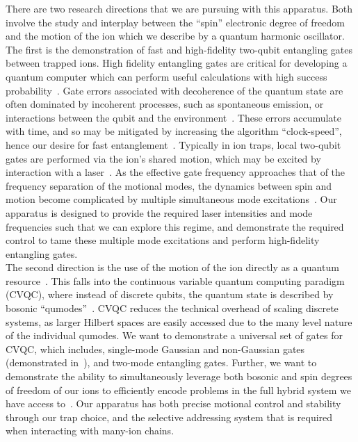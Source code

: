    There are two research directions that we are pursuing with this apparatus.
    Both involve the study and interplay between the ``spin'' electronic degree
    of freedom and the motion of the ion which we describe by a quantum harmonic
    oscillator.\\
    The first is the demonstration of fast and high-fidelity two-qubit
    entangling gates between trapped ions. High fidelity entangling gates are
    critical for developing a quantum computer which can perform useful
    calculations with high success probability~\cite{}. Gate errors associated with
    decoherence of the quantum state are often dominated by incoherent
    processes, such as spontaneous emission, or interactions between the qubit
    and the environment~\cite{wineland_experimental_1998}. These errors accumulate with time, and so may be
    mitigated by increasing the algorithm ``clock-speed'', hence our desire for
    fast entanglement~\cite{}. Typically in ion traps, local two-qubit gates are
    performed via the ion's shared motion, which may be excited by interaction
    with a laser~\cite{sorensen_entanglement_2000}. As the effective gate frequency approaches that of the
    frequency separation of the motional modes, the dynamics between spin and
    motion become complicated by multiple simultaneous mode excitations~\cite{schafer_fast_2018}. Our
    apparatus is designed to provide the required laser intensities and mode
    frequencies such that we can explore this regime, and demonstrate the
    required control to tame these multiple mode excitations and perform
    high-fidelity entangling gates.\\
    The second direction is the use of the motion of the ion directly as a
    quantum resource~\cite{}. This falls into the continuous variable quantum computing
    paradigm (CVQC), where instead of discrete qubits, the quantum state is
    described by bosonic ``qumodes''~\cite{}. CVQC reduces the
    technical overhead of scaling discrete systems, as larger Hilbert spaces are
    easily accessed due to the many level nature of the individual qumodes.
    We want to demonstrate a
    universal set of gates for CVQC, which includes, single-mode Gaussian and
    non-Gaussian gates (demonstrated in~\cite{bazavan_squeezing_2024}), and two-mode entangling gates. Further, we want to demonstrate the ability to simultaneously leverage both
    bosonic and spin degrees of freedom of our ions to efficiently encode
    problems in the full hybrid system we have access to~\cite{varona_towards_2024, brenner_factoring_2025}. Our apparatus has both
    precise motional control and stability through our trap choice, and the
    selective addressing system that is required when interacting with many-ion
    chains.\\
    
